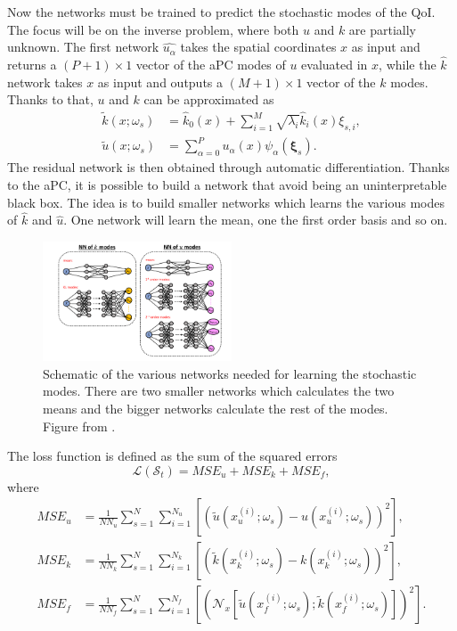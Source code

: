 \documentclass[11pt,a4paper]{article}
\begin{document}
Now the networks must be trained to predict the stochastic modes of the QoI. The focus will be on the inverse problem, where both \(u\) and \(k\) are partially unknown. The first network \(\hat{u_\alpha}\) takes the spatial coordinates \(x\) as input and returns a \((P+1) \times 1\) vector of the aPC modes of \(u\) evaluated in \(x\), while the \(\hat{k}\) network takes \(x\) as input and outputs a \((M+1) \times 1\) vector of the \(k\) modes. Thanks to that, \(u\) and \(k\) can be approximated as 
\begin{align*}
    \tilde{k}(x; \omega_s) &= \hat{k}_0(x) + \sum_{i=1}^{M} \sqrt{\lambda_i} \hat{k}_i(x) \xi_{s,i}, \\
    \tilde{u}(x;\omega_s) &= \sum_{\alpha=0}^{P} \hat{u_\alpha}(x)\psi_\alpha(\bm{\xi}_s).
\end{align*}
The residual network is then obtained through automatic differentiation. Thanks to the aPC, it is possible to build a network that avoid being an uninterpretable black box. The idea is to build smaller networks which learns the various modes of \(\hat{k}\) and \(\hat{u}\). One network will learn the mean, one the first order basis and so on.
\begin{figure}[H]
    \centering 
    \includegraphics[width=0.5\textwidth]{Images/PINN_structure_3.png}
    \captionsetup{justification=centering,margin=1cm}
    \caption{Schematic of the various networks needed for learning the stochastic modes. There are two smaller networks which calculates the two means and the bigger networks calculate the rest of the modes. Figure from \cite{Zhang_2019}.}
\end{figure}
The loss function is defined as the sum of the squared errors
\[
    \mathcal{L}(\mathcal{S}_t) = MSE_u + MSE_k + MSE_f,
\]
where 
\begin{align*}
    MSE_u &= \frac{1}{NN_u} \sum_{s=1}^{N}\sum_{i=1}^{N_u} \left[ (\tilde{u}(x^{(i)}_u;\omega_s) - u(x^{(i)}_u; \omega_s))^2 \right], \\
    MSE_k &= \frac{1}{NN_k} \sum_{s=1}^{N}\sum_{i=1}^{N_k} \left[ (\tilde{k}(x^{(i)}_k;\omega_s) - k(x^{(i)}_k; \omega_s))^2 \right], \\
    MSE_f &= \frac{1}{NN_f} \sum_{s=1}^{N}\sum_{i=1}^{N_f} \left[ \left(\mathcal{N}_x[\tilde{u}(x^{(i)}_f;\omega_s);\tilde{k}(x^{(i)}_f;\omega_s)]\right)^2 \right].
\end{align*}
\end{document}
